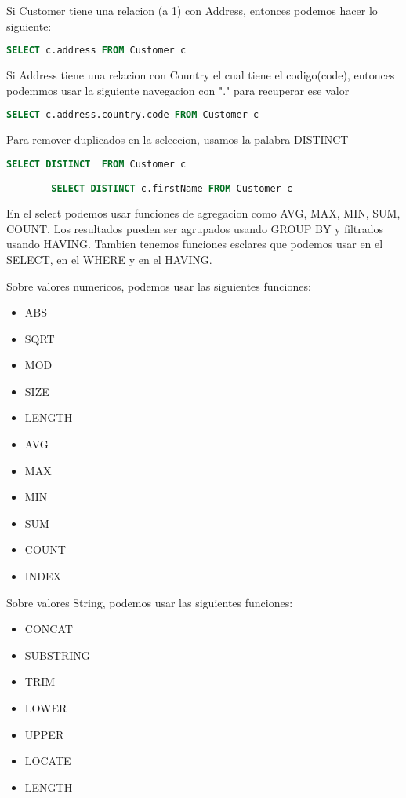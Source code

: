 \documentclass{article}
\begin{document}
Si Customer tiene una relacion (a 1) con Address, entonces podemos hacer lo siguiente:

\begin{lstlisting}[language=SQL]
        SELECT c.address FROM Customer c
        \end{lstlisting}
Si Address tiene una relacion con Country el cual tiene el codigo(code), entonces podemmos usar la siguiente navegacion con "." para recuperar ese valor
\begin{lstlisting}[language=SQL]
        SELECT c.address.country.code FROM Customer c
        \end{lstlisting}

Para remover duplicados en la seleccion, usamos la palabra DISTINCT
\begin{lstlisting}[language=SQL]
        SELECT DISTINCT  FROM Customer c

        SELECT DISTINCT c.firstName FROM Customer c
        \end{lstlisting}
En el select podemos usar funciones de agregacion como AVG, MAX, MIN, SUM, COUNT. Los resultados pueden ser agrupados usando GROUP BY y filtrados usando HAVING. Tambien tenemos funciones esclares que
podemos usar en el SELECT, en el WHERE y en el HAVING.

Sobre valores numericos, podemos usar las siguientes funciones:
\begin{itemize}
	\item ABS
	\item SQRT
	\item MOD
	\item SIZE
	\item LENGTH
	\item AVG
	\item MAX
	\item MIN
	\item SUM
	\item COUNT
	\item INDEX
\end{itemize}

Sobre valores String, podemos usar las siguientes funciones:

\begin{itemize}
	\item CONCAT
	\item SUBSTRING
	\item TRIM
	\item LOWER
	\item UPPER
	\item LOCATE
	\item LENGTH
\end{itemize}
\end{document}
